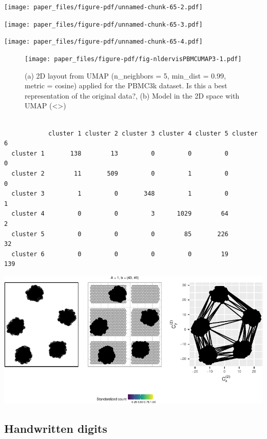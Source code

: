 \documentclass[
  12pt]{article}
\begin{document}
\texttt{[image: paper\_files/figure-pdf/unnamed-chunk-65-2.pdf]}

\texttt{[image: paper\_files/figure-pdf/unnamed-chunk-65-3.pdf]}

\texttt{[image: paper\_files/figure-pdf/unnamed-chunk-65-4.pdf]}

\begin{figure}[h]

{\centering \texttt{[image: paper\_files/figure-pdf/fig-nldervisPBMCUMAP3-1.pdf]}

}

\caption{\label{fig-nldervisPBMCUMAP3}(a) 2D layout from UMAP
(n\_neighbors = 5, min\_dist = 0.99, metric = cosine) applied for the
PBMC3k dataset. Is this a best representation of the original data?, (b)
Model in the 2D space with UMAP (\textless\textgreater)}

\end{figure}

\begin{verbatim}
           
            cluster 1 cluster 2 cluster 3 cluster 4 cluster 5 cluster 6
  cluster 1       138        13         0         0         0         0
  cluster 2        11       509         0         1         0         0
  cluster 3         1         0       348         1         0         1
  cluster 4         0         0         3      1029        64         2
  cluster 5         0         0         0        85       226        32
  cluster 6         0         0         0         0        19       139
\end{verbatim}

\includegraphics{paper_files/figure-pdf/unnamed-chunk-68-1.pdf}

\hypertarget{handwritten-digits}{%
\subsection{Handwritten digits}\label{handwritten-digits}}
\end{document}
